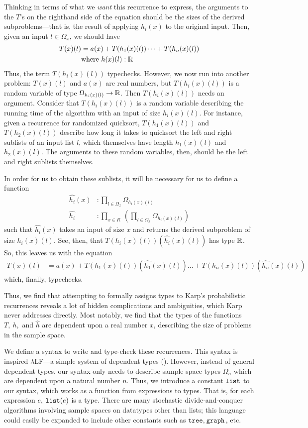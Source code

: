 Thinking in terms of what we \emph{want} this recurrence to express, the arguments to the $T$'s on the righthand side of
the equation should be the sizes of the derived subproblems---that is, the result of applying $h_i(x)$ to the original input.
Then, given an input $l \in \Omega_x$, we should have
\begin{align*}
T(x)(l) &= a(x) + T(h_1(x)(l)) \dots + T(h_n(x)(l)) \\
&\text{where } h(x)(l) : \mathbb{R} 
\end{align*}
 Thus, the term $T(h_i(x)(l))$ typechecks. However, we now run into another problem: $T(x)(l)$ and $a(x)$ are real numbers,
but $T(h_i(x)(l))$ is a random variable of type $\Omega_{h_i(x)(l)} \rightarrow \mathbb{R}$. Then $T(h_i(x)(l))$ needs an argument.
Consider that $T(h_i(x)(l))$ is a random variable describing the running time of the algorithm with an input of size 
$h_i(x)(l)$. For instance, given a recurrence for randomized quicksort, $T(h_1(x)(l))$ and $T(h_2(x)(l))$ describe how long it 
takes to quicksort the left and right sublists of an input list $l$, which themselves have length $h_1(x)(l)$ and
$h_2(x)(l)$. The arguments to these random variables, then, should be the left and right sublists themselves. 

 In order for us to obtain these sublists, it will be necessary for us to define a function 
 \begin{align*}
 \hat{h_i}(x) &: \prod_{l \in \Omega_x} \Omega_{h_i(x)(l)} \\
 \hat{h_i} &: \prod_{x \in R} \ ( \prod_{l \in \Omega_x} \Omega_{h_i(x)(l)})
 \end{align*}
 such that $\hat{h_i}(x)$ takes an input of size $x$ and returns the derived subproblem of size $h_i(x)(l)$. See, then, that
 $T(h_i(x)(l))(\hat{h_i}(x)(l))$ has type $\mathbb{R}$. So, this leaves us with the equation
 \begin{align*}
 T(x)(l) &= a(x) + T(h_1(x)(l))(\hat{h_1}(x)(l)) \dots + T(h_n(x)(l))(\hat{h_n}(x)(l))
 \end{align*}
 which, finally, typechecks.
 
 Thus, we find that attempting to formally assigns types to Karp's probabilistic recurrences reveals a lot of hidden 
 complications and ambiguities, which Karp never addresses directly. Most notably, we find that the types of the 
 functions $T, \ h,$ and $\hat{h}$ are dependent upon a real number $x$, describing the size of problems in the sample space.
 
We define a syntax to write and type-check these recurrences. This syntax is inspired $\lambda$LF---a simple system of 
dependent types (\cite{Pierce:2005aa}). However, instead of general dependent types, our syntax only needs to
describe sample space types $\Omega_n$ which are dependent upon a natural number $n$. Thus, we introduce
a constant $\texttt{list}$ to our syntax, which works as a function from expressions to types. That is, for each 
expression $e$, $\texttt{list}(e)$ is a type. There are many stochastic divide-and-conquer algorithms involving sample spaces
on datatypes other than lists; this language could easily be expanded to include other constants such as
 $\texttt{tree}, \ \texttt{graph}$, etc.

